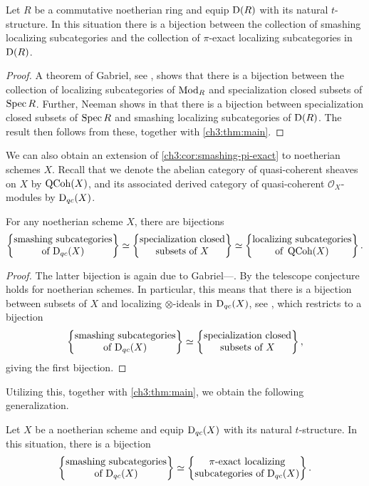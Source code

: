 \begin{corollary}
    \label{ch3:cor:smashing-pi-exact}
    Let $R$ be a commutative noetherian ring and equip $\mathrm{D}(R)$ with its natural $t$-structure. In this situation there is a bijection between the collection of smashing localizing subcategories and the collection of $\pi$-exact localizing subcategories in $\mathrm{D}(R)$. 
\end{corollary}
\begin{proof}
    A theorem of Gabriel, see \cite[VI.2.4(b)]{gabriel_1962}, shows that there is a bijection between the collection of localizing subcategories of $\mathrm{Mod}_R$ and specialization closed subsets of $\operatorname{Spec} R$. Further, Neeman shows in \cite[3.3]{neeman_1992} that there is a bijection between specialization closed subsets of $\operatorname{Spec} R$ and smashing localizing subcategories of $\mathrm{D}(R)$. The result then follows from these, together with \cref{ch3:thm:main}. 
\end{proof}

We can also obtain an extension of \cref{ch3:cor:smashing-pi-exact} to noetherian schemes $X$. Recall that we denote the abelian category of quasi-coherent sheaves on $X$ by $\operatorname{QCoh}(X)$, and its associated derived category of quasi-coherent $\mathcal{O}_X$-modules by $\mathrm{D}_{qc}(X)$. 

\begin{lemma}
    For any noetherian scheme $X$, there are bijections
    \[\left\{ \begin{matrix} \text{smashing subcategories}\\ \text{of }\mathrm{D}_{qc}(X) \end{matrix} \right\}\simeq \left\{ \begin{matrix} \text{specialization closed}\\ \text{subsets of }X \end{matrix} \right\} \simeq \left\{ \begin{matrix} \text{localizing subcategories}\\ \text{of }\operatorname{QCoh}(X) \end{matrix} \right\}.\]
\end{lemma}
\begin{proof}
    The latter bijection is again due to Gabriel---\cite[VI.2.4(b)]{gabriel_1962}. By \cite[4.13]{tarrio-lopez-salorio_2004} the telescope conjecture holds for noetherian schemes. In particular, this means that there is a bijection between subsets of $X$ and localizing $\otimes$-ideals in $\mathrm{D}_{qc}(X)$, see \cite[8.13]{stevenson_2013}, which restricts to a bijection
    \[\left\{ \begin{matrix} \text{smashing subcategories}\\ \text{of }\mathrm{D}_{qc}(X) \end{matrix} \right\}\simeq \left\{ \begin{matrix} \text{specialization closed}\\ \text{subsets of }X \end{matrix} \right\},\]
    giving the first bijection. 
\end{proof}

Utilizing this, together with \cref{ch3:thm:main}, we obtain the following generalization. 

\begin{corollary}
    Let $X$ be a noetherian scheme and equip $\mathrm{D}_{qc}(X)$ with its natural $t$-structure. In this situation, there is a bijection
    \[\left\{ \begin{matrix} \text{smashing subcategories}\\ \text{of }\mathrm{D}_{qc}(X) \end{matrix} \right\} \simeq \left\{ \begin{matrix} \pi\text{-exact localizing}\\ \text{subcategories of }\mathrm{D}_{qc}(X) \end{matrix} \right\}.\]
\end{corollary}

